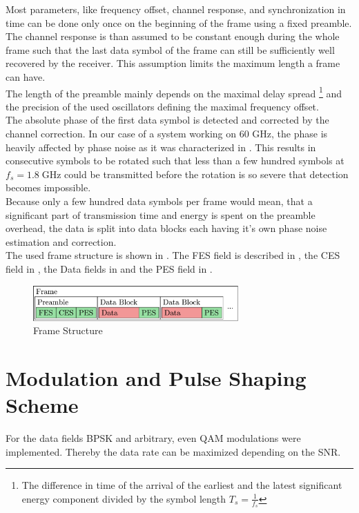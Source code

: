 Most parameters, like frequency offset, channel response, and
synchronization in time can be done only once on the beginning of the
frame using a fixed preamble.
The channel response is than assumed to be constant enough during
the whole frame such that the last data symbol of the frame can still be
sufficiently well recovered by the receiver.
This assumption limits the maximum length a frame can have. \\

The length of the preamble mainly depends on the maximal delay spread%
\footnote{The difference in time of the arrival of the earliest and the
  latest significant energy component divided by the symbol length
  $T_s = \frac{1}{f_s}$} and the precision of the used oscillators defining
the maximal frequency offset. \\

The absolute phase of the first data symbol is detected and corrected by the
channel correction. In our case of a system working on 60 GHz, the
phase is heavily affected by phase noise as it was characterized in
. This results in consecutive symbols to be
rotated such that less than a few hundred symbols at $f_s = 1.8 \;\text{GHz}$
could be transmitted before the rotation is so severe that detection
becomes impossible. \\

Because only a few hundred data symbols per frame would mean,
that a significant part of transmission time and energy is spent
on the preamble overhead, the data is split into data blocks each having
it's own phase noise estimation and correction. \\

The used frame structure is shown in .
The \gls{FES} field is described in ,
the \gls{CES} field in ,
the Data fields in  and the
\gls{PES} field in .

\begin{figure}[ht]
  \centering
  \includegraphics[width=0.7\textwidth]{figures/frame_struct}
  \caption{Frame Structure}
  \label{fig:sys_frame_struct}
\end{figure}

\section{Modulation and Pulse Shaping Scheme}
For the data fields \gls{BPSK}  and arbitrary, even
\gls{QAM} modulations were implemented. Thereby the data rate
can be maximized depending on the \gls{SNR}. \\

